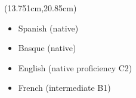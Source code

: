 \documentclass{resume}
\begin{document}
\begin{adjustwidth}{-2mm}{0pt}
\begin{textblock*}{7.13cm}(13.751cm,20.85cm)
\begin{itemize}\setlength\itemsep{-1.5pt}
\vspace{8pt}
    \item Spanish (native)
    \item Basque (native)
    \item English (native proficiency C2)
    \item French (intermediate B1)
\end{itemize}
\end{textblock*}
\end{adjustwidth}
\end{document}
